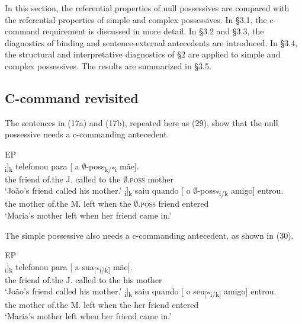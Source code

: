 \documentclass[output=paper]{langsci/langscibook}
\begin{document}
In this section, the referential properties of null possessives are compared with the referential properties of simple and complex possessives. In §3.1, the c-com\-mand requirement is discussed in more detail. In §3.2 and §3.3, the diagnostics of  binding and sentence-external antecedents are introduced. In §3.4, the structural and interpretative diagnostics of §2 are applied to simple and complex possessives. The results are summarized in §3.5.

\subsection{C-command revisited}%

The sentences in (17a) and (17b), repeated here as (29), show that the null possessive needs a c-commanding antecedent.

\ea%
    EP\label{ex:wein:29}\\
    \ea
    \gll \relax[ O amigo d[o João]\textsubscript{i}]\textsubscript{k} telefonou para [ a $\emptyset$-poss\textsubscript{k/*i} mãe].\\
         {} the friend of.the J. called   to {} the $\emptyset$\textsc{.poss} mother\\
    \glt ‘João’s friend called his mother.’
    \ex  
    \gll \relax [ A mãe d[a Maria]\textsubscript{i}]\textsubscript{k} saiu quando [ o $\emptyset$-poss\textsubscript{*i/k} amigo] entrou.\\
         {} the mother of.the M. left when {} the $\emptyset$\textsc{.poss} friend entered\\
    \glt ‘Maria’s mother left when her friend came in.’
    \z
\z    


The simple possessive also needs a c-commanding antecedent, as shown in (30).

\ea%
    EP\label{ex:wein:30}\\
    \ea
    \gll \relax[ O amigo d[o João]\textsubscript{i}]\textsubscript{k} telefonou para [ a   sua\textsubscript{[*i/k]} mãe].\\
         {} the friend of.the J. called   to {} the his mother\\
    \glt ‘João’s friend called his mother.’
    \ex  
    \gll \relax[ A mãe d[a Maria]\textsubscript{i}]\textsubscript{k} saiu quando [ o seu\textsubscript{[*i/k]} amigo] entrou.\\
        {} the mother of.the M. left when {} the her friend entered\\
    \glt ‘Maria’s mother left when her friend came in.’
    \z
\z
\end{document}

